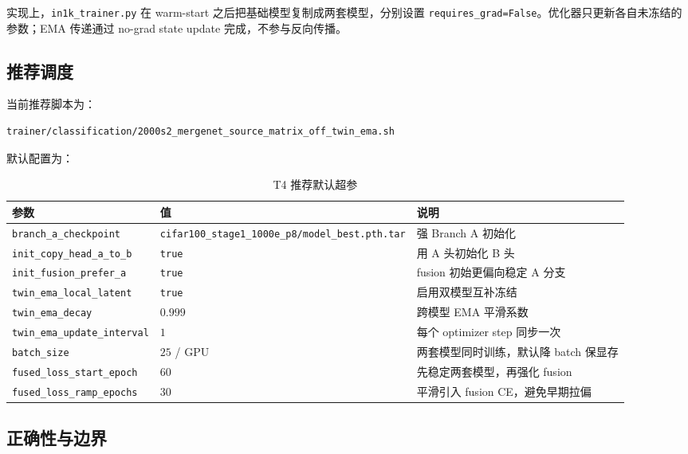 \documentclass[a4paper,11pt]{article}
\begin{document}
实现上，\texttt{in1k\_trainer.py} 在 warm-start 之后把基础模型复制成两套模型，分别设置 \texttt{requires\_grad=False}。优化器只更新各自未冻结的参数；EMA 传递通过 no-grad state update 完成，不参与反向传播。

\subsection{推荐调度}

当前推荐脚本为：

\begin{verbatim}
trainer/classification/2000s2_mergenet_source_matrix_off_twin_ema.sh
\end{verbatim}

默认配置为：

\begin{table}[h]
\centering
\caption{T4 推荐默认超参}
\begin{tabular}{l l l}
\toprule
\textbf{参数} & \textbf{值} & \textbf{说明} \\
\midrule
\texttt{branch\_a\_checkpoint} & \texttt{cifar100\_stage1\_1000e\_p8/model\_best.pth.tar} & 强 Branch A 初始化 \\
\texttt{init\_copy\_head\_a\_to\_b} & \texttt{true} & 用 A 头初始化 B 头 \\
\texttt{init\_fusion\_prefer\_a} & \texttt{true} & fusion 初始更偏向稳定 A 分支 \\
\texttt{twin\_ema\_local\_latent} & \texttt{true} & 启用双模型互补冻结 \\
\texttt{twin\_ema\_decay} & $0.999$ & 跨模型 EMA 平滑系数 \\
\texttt{twin\_ema\_update\_interval} & $1$ & 每个 optimizer step 同步一次 \\
\texttt{batch\_size} & $25$ / GPU & 两套模型同时训练，默认降 batch 保显存 \\
\texttt{fused\_loss\_start\_epoch} & $60$ & 先稳定两套模型，再强化 fusion \\
\texttt{fused\_loss\_ramp\_epochs} & $30$ & 平滑引入 fusion CE，避免早期拉偏 \\
\bottomrule
\end{tabular}
\end{table}

\subsection{正确性与边界}
\end{document}
